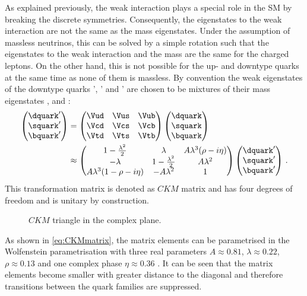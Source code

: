 As explained previously, the weak interaction plays a special role in the \ac{SM} by breaking the discrete symmetries.
Consequently, the eigenstates to the weak interaction are not the same as the mass eigenstates.
Under the assumption of massless neutrinos, this can be solved by a simple rotation such that the eigenstates to the weak interaction and the mass are the same for the charged leptons.
On the other hand, this is not possible for the up- and downtype quarks at the same time as none of them is massless.
By convention the weak eigenstates of the downtype quarks \dquark', \squark' and \bquark' are chosen to be mixtures of their mass eigenstates \dquark, \squark and \bquark:
\begin{align}
\begin{pmatrix} \dquark' \\ \squark' \\ \bquark' \end{pmatrix}
&= \begin{pmatrix} \Vud & \Vus & \Vub \\ \Vcd & \Vcs & \Vcb \\ \Vtd & \Vts & \Vtb \end{pmatrix}
\begin{pmatrix} \dquark \\ \squark \\ \bquark \end{pmatrix}\nonumber \\
&\approx \begin{pmatrix} 1-\frac{\lambda^2}{2} & \lambda & A\lambda^3(\rho-i\eta) \\
                        -\lambda & 1-\frac{\lambda^2}{2} & A\lambda^2 \\
                        A\lambda^3(1-\rho-i\eta) & -A\lambda^2 & 1 \end{pmatrix}
\begin{pmatrix} \dquark' \\ \squark' \\ \bquark' \end{pmatrix}\,. \label{eq:CKMmatrix}
\end{align}
This transformation matrix is denoted as $CKM$ matrix and has four degrees of freedom and is unitary by construction.
\begin{figure}[tbp]
	\centering
	
	\caption{$CKM$ triangle in the complex plane.}
	\label{fig:ckmtheory}
\end{figure}
As shown in \cref{eq:CKMmatrix}, the matrix elements can be parametrised in the Wolfenstein parametrisation \cite{Wolfenstein:1983yz} with three real parameters $A\approx0.81$, $\lambda\approx0.22$, $\rho\approx0.13$ \cite{PDG_2017} and one complex phase $\eta\approx0.36$ \cite{PDG_2017}.
It can be seen that the matrix elements become smaller with greater distance to the diagonal and therefore transitions between the quark families are suppressed.

